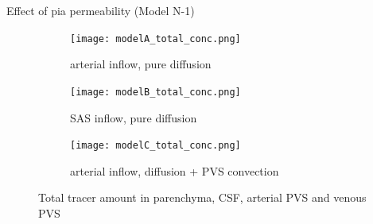 Effect of pia permeability (Model N-1)    

\begin{figure}
     \centering
     \begin{subfigure}[b]{0.33\textwidth}
         \centering
         \texttt{[image: modelA\_total\_conc.png]}
         \caption{arterial inflow, pure diffusion}
         \label{fig:y equals x}
     \end{subfigure}
     \hfill
     \begin{subfigure}[b]{0.33\textwidth}
         \centering
         \texttt{[image: modelB\_total\_conc.png]}
         \caption{SAS inflow, pure diffusion}
         \label{fig:three sin x}
     \end{subfigure}
     \hfill
     \begin{subfigure}[b]{0.33\textwidth}
         \centering
         \texttt{[image: modelC\_total\_conc.png]}
         \caption{arterial inflow, diffusion + PVS convection}
         \label{fig:five over x}
     \end{subfigure}
        \caption{Total tracer amount in parenchyma, CSF, arterial PVS and venous PVS}
        \label{fig:three graphs}
\end{figure}

